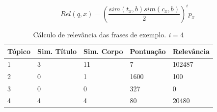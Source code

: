 \begin{equation}
    Rel(q, x) = \left(\frac{sim(t_{x}, b)  sim(c_{x}, b)}{2}\right)^{i}  p_{x} 
    \label{eq:rel}
\end{equation}

\begin{table}[htb]
	\centering
    \def\arraystretch{1.2} %
    \begin{tabular}{|l|l|l|l|l|}
        \hline
        Tópico & Sim. Título & Sim. Corpo & Pontuação & \textbf{Relevância} \\ \hline
        1 & 3 & 11 & 7 & 102487 \\ \hline
        2 & 0 & 1 & 1600 & 100 \\ \hline
        3 & 0 & 0 & 327 & 0 \\ \hline
        4 & 4 & 4 & 80 & 20480 \\ \hline
    \end{tabular}
	\caption{Cálculo de relevância das frases de exemplo. \textit{i} = 4}
    \label{tab:relevance}
\end{table}


